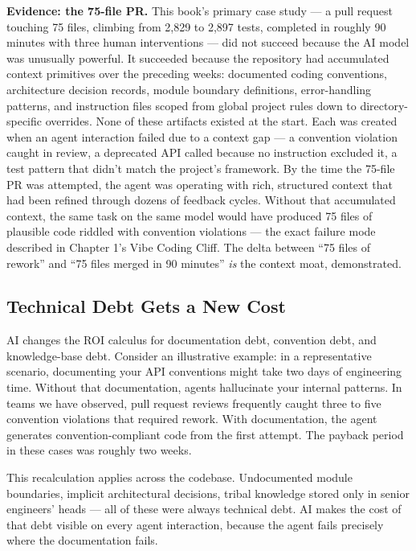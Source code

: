\documentclass[
  a4paper,
  DIV=11,
  numbers=noendperiod]{scrreprt}
\begin{document}
\textbf{Evidence: the 75-file PR.} This book's primary case study --- a
pull request touching 75 files, climbing from 2,829 to 2,897 tests,
completed in roughly 90 minutes with three human interventions --- did
not succeed because the AI model was unusually powerful. It succeeded
because the repository had accumulated context primitives over the
preceding weeks: documented coding conventions, architecture decision
records, module boundary definitions, error-handling patterns, and
instruction files scoped from global project rules down to
directory-specific overrides. None of these artifacts existed at the
start. Each was created when an agent interaction failed due to a
context gap --- a convention violation caught in review, a deprecated
API called because no instruction excluded it, a test pattern that
didn't match the project's framework. By the time the 75-file PR was
attempted, the agent was operating with rich, structured context that
had been refined through dozens of feedback cycles. Without that
accumulated context, the same task on the same model would have produced
75 files of plausible code riddled with convention violations --- the
exact failure mode described in Chapter 1's Vibe Coding Cliff. The delta
between ``75 files of rework'' and ``75 files merged in 90 minutes''
\emph{is} the context moat, demonstrated.

\subsection{Technical Debt Gets a New
Cost}\label{technical-debt-gets-a-new-cost}

AI changes the ROI calculus for documentation debt, convention debt, and
knowledge-base debt. Consider an illustrative example: in a
representative scenario, documenting your API conventions might take two
days of engineering time. Without that documentation, agents hallucinate
your internal patterns. In teams we have observed, pull request reviews
frequently caught three to five convention violations that required
rework. With documentation, the agent generates convention-compliant
code from the first attempt. The payback period in these cases was
roughly two weeks.

This recalculation applies across the codebase. Undocumented module
boundaries, implicit architectural decisions, tribal knowledge stored
only in senior engineers' heads --- all of these were always technical
debt. AI makes the cost of that debt visible on every agent interaction,
because the agent fails precisely where the documentation fails.
\end{document}
